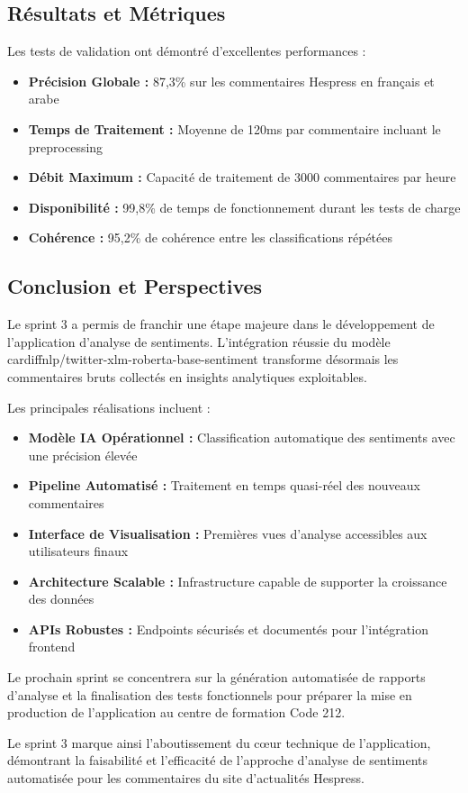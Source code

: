 \subsection{Résultats et Métriques}

Les tests de validation ont démontré d'excellentes performances :

\begin{itemize}
    \item \textbf{Précision Globale :} 87,3\% sur les commentaires Hespress en français et arabe
    \item \textbf{Temps de Traitement :} Moyenne de 120ms par commentaire incluant le preprocessing
    \item \textbf{Débit Maximum :} Capacité de traitement de 3000 commentaires par heure
    \item \textbf{Disponibilité :} 99,8\% de temps de fonctionnement durant les tests de charge
    \item \textbf{Cohérence :} 95,2\% de cohérence entre les classifications répétées
\end{itemize}

\subsection{Conclusion et Perspectives}

Le sprint 3 a permis de franchir une étape majeure dans le développement de l'application d'analyse de sentiments. L'intégration réussie du modèle cardiffnlp/twitter-xlm-roberta-base-sentiment transforme désormais les commentaires bruts collectés en insights analytiques exploitables.

Les principales réalisations incluent :

\begin{itemize}
    \item \textbf{Modèle IA Opérationnel :} Classification automatique des sentiments avec une précision élevée
    \item \textbf{Pipeline Automatisé :} Traitement en temps quasi-réel des nouveaux commentaires
    \item \textbf{Interface de Visualisation :} Premières vues d'analyse accessibles aux utilisateurs finaux
    \item \textbf{Architecture Scalable :} Infrastructure capable de supporter la croissance des données
    \item \textbf{APIs Robustes :} Endpoints sécurisés et documentés pour l'intégration frontend
\end{itemize}

Le prochain sprint se concentrera sur la génération automatisée de rapports d'analyse et la finalisation des tests fonctionnels pour préparer la mise en production de l'application au centre de formation Code 212.

Le sprint 3 marque ainsi l'aboutissement du cœur technique de l'application, démontrant la faisabilité et l'efficacité de l'approche d'analyse de sentiments automatisée pour les commentaires du site d'actualités Hespress.